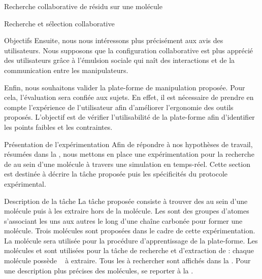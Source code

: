 \documentclass[myfrancais]{mythesis}
\begin{document}
\begin{mychapter}{Recherche collaborative de résidu sur une molécule}
\begin{mysection}{Recherche et sélection collaborative}
\begin{mysubsection}{Objectifs}
				Ensuite, nous nous intéressons plus précisément aux avis des utilisateurs.
				Nous supposons que la configuration collaborative est plus apprécié des utilisateurs grâce à l'émulsion sociale qui naît des interactions et de la communication entre les manipulateurs.

				Enfin, nous souhaitons valider la plate-forme de manipulation proposée.
				Pour cela, l'évaluation sera confiée aux sujets.
				En effet, il est nécessaire de prendre en compte l'expérience de l'utilisateur afin d'améliorer l'ergonomie des outils proposés.
				L'objectif est de vérifier l'utilisabilité de la plate-forme afin d'identifier les points faibles et les contraintes.
			\end{mysubsection}
		\end{mysection}
		\begin{mysection}{Présentation de l'expérimentation}
			Afin de répondre à nos hypothèses de travail, résumées dans la , nous mettons en place une expérimentation pour la recherche de  au sein d'une molécule à travers une simulation en temps-réel.
			Cette section est destinée à décrire la tâche proposée puis les spécificités du protocole expérimental.
			\begin{mysubsection}{Description de la tâche}
				La tâche proposée consiste à trouver des  au sein d'une molécule puis à les extraire hors de la molécule.
				Les  sont des groupes d'atomes s'associant les uns aux autres le long d'une chaîne carbonée pour former une molécule.
				Trois molécules sont proposées dans le cadre de cette expérimentation.
				La molécule \myTRPZIPPER sera utilisée pour la procédure d'apprentissage de la plate-forme.
				Les molécules \myTRPCAGE et \myPrion sont utilisées pour la tâche de recherche et d'extraction de  : chaque molécule possède ~ à extraire.
				Tous les  à rechercher sont affichés dans la .
				Pour une description plus précises des molécules, se reporter à la .


\end{mysubsection}
\end{mysection}
\end{mychapter}
\end{document}
